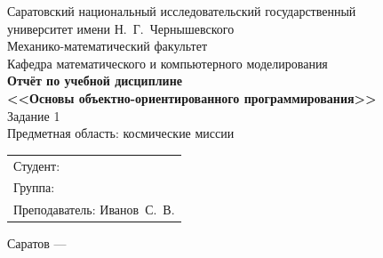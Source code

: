\documentclass[a4paper,14pt]{extarticle}
\begin{document}
% 

\begin{titlepage}
\centering
\vspace*{1cm}
{\large Саратовский национальный исследовательский государственный}\\[0.3em]
{\large университет имени Н.~Г.~Чернышевского}\\[0.5em]
{\large Механико-математический факультет}\\[0.3em]
{\large Кафедра математического и компьютерного моделирования}\\[2cm]

{\Large\bfseries Отчёт по учебной дисциплине}\\[0.5em]
{\Large\bfseries <<Основы объектно-ориентированного программирования>>}\\[1.5cm]

{\large Задание 1}\\[0.5em]
{\large Предметная область: космические миссии}\\[3cm]

\begin{flushright}
\begin{tabular}{l}
Студент: \underline{\hspace{5.5cm}}\\[1em]
Группа: \underline{\hspace{5.5cm}}\\[1em]
Преподаватель: Иванов~С.~В.
\end{tabular}
\end{flushright}

\vfill
Саратов --- \the\year
\end{titlepage}

\setcounter{page}{2}
\tableofcontents
\thispagestyle{fancy}
\clearpage

\end{document}
